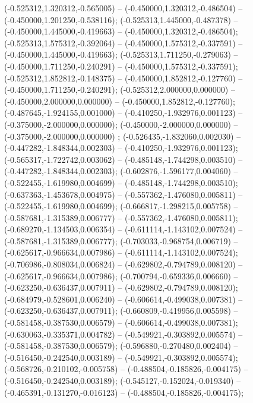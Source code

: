  (-0.525312,1.320312,-0.565005) -- (-0.450000,1.320312,-0.486504) -- (-0.450000,1.201250,-0.538116);
 (-0.525313,1.445000,-0.487378) -- (-0.450000,1.445000,-0.419663) -- (-0.450000,1.320312,-0.486504);
 (-0.525313,1.575312,-0.392064) -- (-0.450000,1.575312,-0.337591) -- (-0.450000,1.445000,-0.419663);
 (-0.525313,1.711250,-0.279063) -- (-0.450000,1.711250,-0.240291) -- (-0.450000,1.575312,-0.337591);
 (-0.525312,1.852812,-0.148375) -- (-0.450000,1.852812,-0.127760) -- (-0.450000,1.711250,-0.240291);
 (-0.525312,2.000000,0.000000) -- (-0.450000,2.000000,0.000000) -- (-0.450000,1.852812,-0.127760);
 (-0.487645,-1.924155,0.001000) -- (-0.410250,-1.932976,0.001123) -- (-0.375000,-2.000000,0.000000);
 (-0.450000,-2.000000,0.000000) -- (-0.375000,-2.000000,0.000000) ;
 (-0.526435,-1.832060,0.002030) -- (-0.447282,-1.848344,0.002303) -- (-0.410250,-1.932976,0.001123);
 (-0.565317,-1.722742,0.003062) -- (-0.485148,-1.744298,0.003510) -- (-0.447282,-1.848344,0.002303);
 (-0.602876,-1.596177,0.004060) -- (-0.522455,-1.619980,0.004699) -- (-0.485148,-1.744298,0.003510);
 (-0.637363,-1.453678,0.004975) -- (-0.557362,-1.476080,0.005811) -- (-0.522455,-1.619980,0.004699);
 (-0.666817,-1.298215,0.005758) -- (-0.587681,-1.315389,0.006777) -- (-0.557362,-1.476080,0.005811);
 (-0.689270,-1.134503,0.006354) -- (-0.611114,-1.143102,0.007524) -- (-0.587681,-1.315389,0.006777);
 (-0.703033,-0.968754,0.006719) -- (-0.625617,-0.966634,0.007986) -- (-0.611114,-1.143102,0.007524);
 (-0.706986,-0.808034,0.006824) -- (-0.629802,-0.794789,0.008120) -- (-0.625617,-0.966634,0.007986);
 (-0.700794,-0.659336,0.006660) -- (-0.623250,-0.636437,0.007911) -- (-0.629802,-0.794789,0.008120);
 (-0.684979,-0.528601,0.006240) -- (-0.606614,-0.499038,0.007381) -- (-0.623250,-0.636437,0.007911);
 (-0.660809,-0.419956,0.005598) -- (-0.581458,-0.387530,0.006579) -- (-0.606614,-0.499038,0.007381);
 (-0.630063,-0.335371,0.004782) -- (-0.549921,-0.303892,0.005574) -- (-0.581458,-0.387530,0.006579);
 (-0.596880,-0.270480,0.002404) -- (-0.516450,-0.242540,0.003189) -- (-0.549921,-0.303892,0.005574);
 (-0.568726,-0.210102,-0.005758) -- (-0.488504,-0.185826,-0.004175) -- (-0.516450,-0.242540,0.003189);
 (-0.545127,-0.152024,-0.019340) -- (-0.465391,-0.131270,-0.016123) -- (-0.488504,-0.185826,-0.004175);

